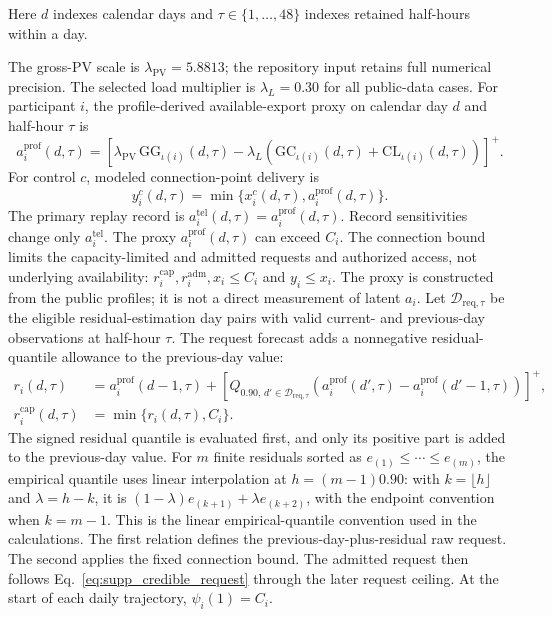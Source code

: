 \documentclass[11pt]{article}
\begin{document}
Here $d$ indexes calendar days and $\tau\in\{1,\ldots,48\}$ indexes retained
half-hours within a day.

The gross-PV scale is $\lambda_{\mathrm{PV}}=5.8813$; the repository input
retains full numerical precision. The selected load multiplier is
$\lambda_L=0.30$ for all public-data cases. For participant $i$, the profile-derived available-export proxy on
calendar day $d$ and half-hour $\tau$ is
\begin{equation}
a_i^{\mathrm{prof}}(d,\tau)=\left[\lambda_{\mathrm{PV}}\,\mathrm{GG}_{\iota(i)}(d,\tau)
-\lambda_L\!\left(\mathrm{GC}_{\iota(i)}(d,\tau)
+\mathrm{CL}_{\iota(i)}(d,\tau)\right)\right]^+.
\label{eq:supp_au_available_export}
\end{equation}
For control $c$, modeled connection-point delivery is
\begin{equation}
y_i^c(d,\tau)=\min\{x_i^c(d,\tau),a_i^{\mathrm{prof}}(d,\tau)\}.
\label{eq:supp_au_modeled_delivery}
\end{equation}
The primary replay record is
$a_i^{\mathrm{tel}}(d,\tau)=a_i^{\mathrm{prof}}(d,\tau)$. Record sensitivities
change only $a_i^{\mathrm{tel}}$. The proxy $a_i^{\mathrm{prof}}(d,\tau)$ can
exceed $C_i$. The connection bound
limits the capacity-limited and admitted requests and authorized access, not
underlying availability:
$r_i^{\mathrm{cap}},r_i^{\mathrm{adm}},x_i\le C_i$ and $y_i\le x_i$.
The proxy is constructed from the public profiles; it is not a direct
measurement of latent $a_i$.
Let $\mathcal D_{\mathrm{req},\tau}$ be the eligible residual-estimation day
pairs with valid current- and previous-day observations at half-hour $\tau$.
The request forecast adds a nonnegative residual-quantile allowance to the
previous-day value:
\begin{align}
r_i(d,\tau)
&=a_i^{\mathrm{prof}}(d-1,\tau)
+\left[Q_{0.90,\,d'\in\mathcal D_{\mathrm{req},\tau}}
\!\left(a_i^{\mathrm{prof}}(d',\tau)-a_i^{\mathrm{prof}}(d'-1,\tau)\right)\right]^+,
\label{eq:supp_au_raw_request}\\
r_i^{\mathrm{cap}}(d,\tau)
&=\min\{r_i(d,\tau),C_i\}.
\label{eq:supp_au_request}
\end{align}
The signed residual quantile is evaluated first, and only its positive part is
added to the previous-day value.
For $m$ finite residuals sorted as $e_{(1)}\le\cdots\le e_{(m)}$, the empirical
quantile uses linear interpolation at $h=(m-1)0.90$: with
$k=\lfloor h\rfloor$ and $\lambda=h-k$, it is
$(1-\lambda)e_{(k+1)}+\lambda e_{(k+2)}$, with the endpoint convention when
$k=m-1$. This is the linear empirical-quantile convention used in the
calculations.
The first relation defines the previous-day-plus-residual raw request. The
second applies the fixed connection bound. The admitted request then follows
Eq.~\eqref{eq:supp_credible_request} through the later request ceiling. At the
start of each daily trajectory, $\psi_i(1)=C_i$.
\end{document}
